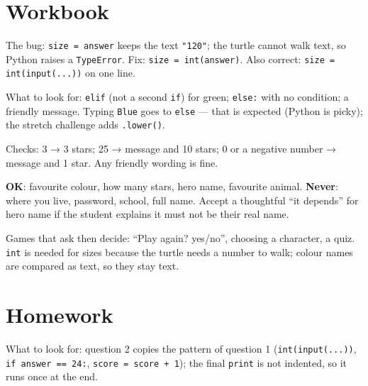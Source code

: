 
\section{Workbook}
\begin{answer}
The bug: \texttt{size = answer} keeps the text \texttt{"120"}; the turtle cannot walk text, so Python raises a \texttt{TypeError}. Fix: \texttt{size = int(answer)}. Also correct: \texttt{size = int(input(...))} on one line.
\end{answer}

\begin{answer}
What to look for: \texttt{elif} (not a second \texttt{if}) for green; \texttt{else:} with no condition; a friendly message. Typing \texttt{Blue} goes to \texttt{else} --- that is expected (Python is picky); the stretch challenge adds \texttt{.lower()}.
\end{answer}

\begin{answer}
Checks: 3 → 3 stars; 25 → message and 10 stars; 0 or a negative number → message and 1 star. Any friendly wording is fine.
\end{answer}

\begin{answer}
\textbf{OK}: favourite colour, how many stars, hero name, favourite animal. \textbf{Never}: where you live, password, school, full name. Accept a thoughtful \enquote{it depends} for hero name if the student explains it must not be their real name.
\end{answer}

\begin{answer}[Reflection]
Games that ask then decide: \enquote{Play again? yes/no}, choosing a character, a quiz. \texttt{int} is needed for sizes because the turtle needs a number to walk; colour names are compared as text, so they stay text.
\end{answer}

\section{Homework}
\begin{answer}
What to look for: question 2 copies the pattern of question 1 (\texttt{int(input(...))}, \texttt{if answer == 24:}, \texttt{score = score + 1}); the final \texttt{print} is not indented, so it runs once at the end.
\end{answer}

